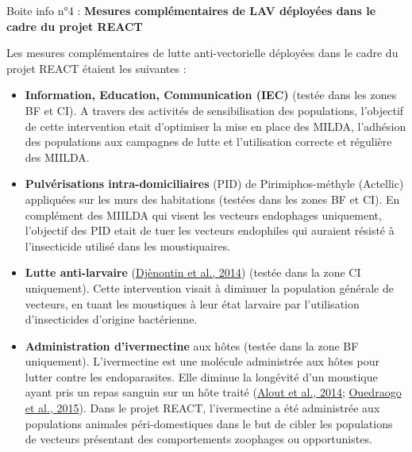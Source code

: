 \documentclass[12pt,twoside]{reedthesis}
\providecommand{\tightlist}{%
  \setlength{\itemsep}{0pt}\setlength{\parskip}{0pt}}
\begin{document}
\begin{lightcyanbox}
\begin{center}
Boite info n°4 : \textbf{Mesures complémentaires de LAV déployées dans le cadre du projet REACT}

\end{center}
Les mesures complémentaires de lutte anti-vectorielle déployées dans le cadre du projet REACT étaient les suivantes :
\begin{itemize}
\tightlist
\item
  \textbf{Information, Education, Communication (IEC)} (testée dans les zones BF et CI). A travers des activités de sensibilisation des populations, l'objectif de cette intervention etait d'optimiser la mise en place des MILDA, l'adhésion des populations aux campagnes de lutte et l'utilisation correcte et régulière des MIILDA.
\item
  \textbf{Pulvérisations intra-domiciliaires} (PID) de Pirimiphos-méthyle (Actellic) appliquées sur les murs des habitations (testées dans les zones BF et CI). En complément des MIILDA qui visent les vecteurs endophages uniquement, l'objectif des PID etait de tuer les vecteurs endophiles qui auraient résisté à l'insecticide utilisé dans les moustiquaires.
\item
  \textbf{Lutte anti-larvaire} (\protect\hyperlink{ref-djenontin_field_2014}{Djènontin et al., 2014}) (testée dans la zone CI uniquement). Cette intervention visait à diminuer la population générale de vecteurs, en tuant les moustiques à leur état larvaire par l'utilisation d'insecticides d'origine bactérienne.
\item
  \textbf{Administration d'ivermectine} aux hôtes (testée dans la zone BF uniquement). L'ivermectine est une molécule administrée aux hôtes pour lutter contre les endoparasites. Elle diminue la longévité d'un moustique ayant pris un repas sanguin sur un hôte traité (\protect\hyperlink{ref-alout_evaluation_2014}{Alout et al., 2014}; \protect\hyperlink{ref-ouedraogo_efficacy_2015}{Ouedraogo et al., 2015}). Dans le projet REACT, l'ivermectine a été administrée aux populations animales péri-domestiques dans le but de cibler les populations de vecteurs présentant des comportements zoophages ou opportunistes.
\end{itemize}
\end{lightcyanbox}
\hfill\break
\end{document}
